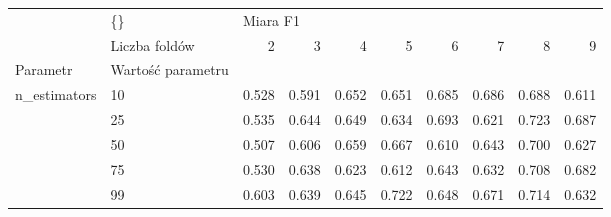 \begin{tabular}{llrrrrrrrr}
\hline
             & \{\} & \multicolumn{8}{l}{Miara F1} \\
             & Liczba foldów &        2 &      3 &      4 &      5 &      6 &      7 &      8 &      9 \\
Parametr & Wartość parametru &          &        &        &        &        &        &        &        \\
\hline
n\_estimators & 10 &    0.528 &  0.591 &  0.652 &  0.651 &  0.685 &  0.686 &  0.688 &  0.611 \\
             & 25 &    0.535 &  0.644 &  0.649 &  0.634 &  0.693 &  0.621 &  0.723 &  0.687 \\
             & 50 &    0.507 &  0.606 &  0.659 &  0.667 &  0.610 &  0.643 &  0.700 &  0.627 \\
             & 75 &    0.530 &  0.638 &  0.623 &  0.612 &  0.643 &  0.632 &  0.708 &  0.682 \\
             & 99 &    0.603 &  0.639 &  0.645 &  0.722 &  0.648 &  0.671 &  0.714 &  0.632 \\
\hline
\end{tabular}
